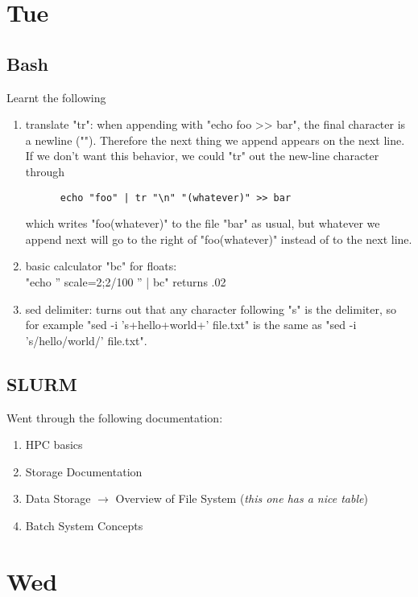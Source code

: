 \documentclass[12pt,letterpaper]{article}
\begin{document}
\setcounter{section}{22}
\section{Tue}
\subsection{Bash}
Learnt the following
\begin{enumerate}
  \item translate "tr": when appending with "echo foo >> bar", 
    the final character is a newline ("\n").
    Therefore the next thing we append appears on the next line.
    If we don't want this behavior, we could "tr" out the new-line character through
    \begin{verbatim}
      echo "foo" | tr "\n" "(whatever)" >> bar
    \end{verbatim}
    which writes "foo(whatever)" to the file "bar" as usual, but
    whatever we append next will go to the right of "foo(whatever)" 
    instead of to the next line.
    
  \item basic calculator "bc" for floats: \\
    "echo '' scale=2;2/100 '' | bc" returns .02 
  \item sed delimiter: turns out that any character following "s" is the delimiter,
    so for example "sed -i 's+hello+world+' file.txt" is the same as
    "sed -i 's/hello/world/' file.txt".
\end{enumerate}


\subsection{SLURM}
Went through the following documentation:
\begin{enumerate}
  \item HPC basics
  \item Storage Documentation
  \item Data Storage $\to$ Overview of File System (\textit{this one has a nice table})
  \item Batch System Concepts
\end{enumerate}


\section{Wed}
\end{document}
